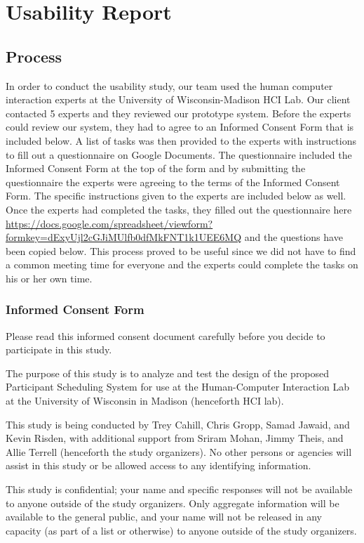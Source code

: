 \section{Usability Report}
\subsection{Process}
In order to conduct the usability study, our team used the human computer interaction experts at the University of Wisconsin-Madison HCI Lab. Our client contacted 5 experts and they reviewed our prototype system. Before the experts could review our system, they had to agree to an Informed Consent Form that is included below. A list of tasks was then provided to the experts with instructions to fill out a questionnaire on Google Documents. The questionnaire included the Informed Consent Form at the top of the form and by submitting the questionnaire the experts were agreeing to the terms of the Informed Consent Form. The specific instructions given to the experts are included below as well. Once the experts had completed the tasks, they filled out the questionnaire here \url{https://docs.google.com/spreadsheet/viewform?formkey=dExyUjl2cGJiMUlfb0dfMkFNT1k1UEE6MQ} and the questions have been copied below. This process proved to be useful since we did not have to find a common meeting time for everyone and the experts could complete the tasks on his or her own time.

\subsubsection{Informed Consent Form}
Please read this informed consent document carefully before you decide to participate in this study.

The purpose of this study is to analyze and test the design of the proposed Participant Scheduling System for use at the Human-Computer Interaction Lab at the University of Wisconsin in Madison (henceforth HCI lab).

This study is being conducted by Trey Cahill, Chris Gropp, Samad Jawaid, and Kevin Risden, with additional support from Sriram Mohan, Jimmy Theis, and Allie Terrell (henceforth the study organizers). No other persons or agencies will assist in this study or be allowed access to any identifying information.

This study is confidential; your name and specific responses will not be available to anyone outside of the study organizers. Only aggregate information will be available to the general public, and your name will not be released in any capacity (as part of a list or otherwise) to anyone outside of the study organizers.


